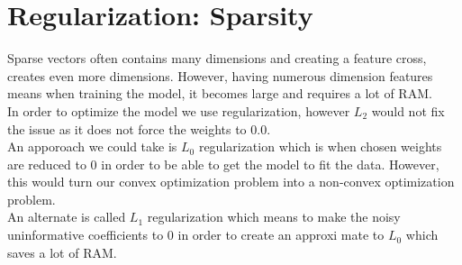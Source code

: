 \documentclass[12pt]{article}
\begin{document}
\section{Regularization: Sparsity}
Sparse vectors often contains many dimensions and creating a feature cross, creates even more dimensions. However, having numerous dimension features means when training the model, it becomes large and requires a lot of RAM.
\\In order to optimize the model we use regularization, however $L_2$ would not fix the issue as it does not force the weights to 0.0.
\\An apporoach we could take is $L_0$ regularization which is when chosen weights are reduced to 0 in order to be able to get the model to fit the data. However, this would turn our convex optimization problem into a non-convex optimization problem. 
\\An alternate is called $L_1$ regularization which means to make the noisy uninformative coefficients to 0 in order to create an approxi  mate to $L_0$  which saves a lot of RAM.
\end{document}
